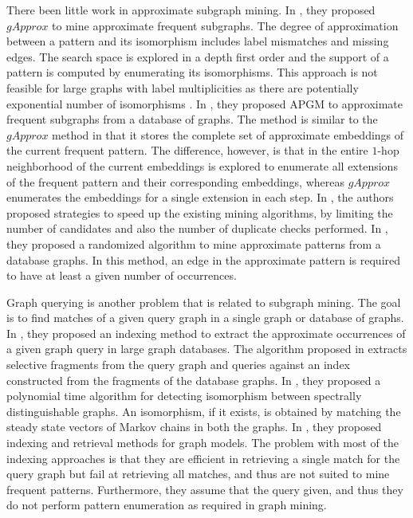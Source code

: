 There been little work in approximate subgraph
mining.  In \cite{gapprox}, they proposed $gApprox$ to mine approximate
frequent subgraphs.  The degree of approximation between a pattern and its
isomorphism includes label mismatches and missing edges. The search space
is explored in a depth first order and the support of a pattern is
computed by enumerating its isomorphisms. This approach is not feasible
for large graphs with label multiplicities as there are potentially
exponential number of isomorphisms \cite{2012-kais}.
In \cite{JiaZH11}, they proposed APGM to approximate frequent
subgraphs from a database of graphs. The method is similar to the
$gApprox$ method in that it stores the complete set of approximate
embeddings of the current frequent pattern. The difference, however, is
that in \cite{JiaZH11} the entire $1$-hop neighborhood of the current
embeddings is explored to enumerate all extensions of the frequent
pattern and their corresponding embeddings, whereas $gApprox$ enumerates
the embeddings for a single extension in each step.  
In \cite{SpeedUpFAS}, the authors proposed strategies
to speed up the existing mining algorithms, by
limiting the number of candidates and also the number of duplicate
checks performed.
In \cite{RAM2008}, they proposed a randomized algorithm to mine
approximate patterns from a database graphs. In this method, an edge in
the approximate pattern is required to have at least a given number of
occurrences. 

Graph querying is another problem that is related to
subgraph mining. The goal is to find matches of a given query graph in a
single graph or database of graphs.  In \cite{TALE}, they proposed an
indexing method to extract the approximate occurrences of a given graph
query in large graph databases.  The algorithm proposed in
\cite{yan.icde:2006} extracts selective fragments from the query graph
and queries against an index constructed from the fragments of the
database graphs. In \cite{RandomMatching}, they proposed a polynomial
time algorithm for detecting isomorphism between spectrally
distinguishable graphs. An isomorphism, if it exists, 
is obtained by matching
the steady state vectors of Markov chains in both the graphs.  In
\cite{BerettiIndexing}, they proposed indexing and retrieval methods for
graph models. The problem with most of the indexing approaches is that
they are efficient in retrieving a single match for the query graph but
fail at retrieving all matches, and thus are not suited to mine frequent
patterns. Furthermore, they assume that the query given, and thus they
do not perform pattern enumeration as required in graph mining.

